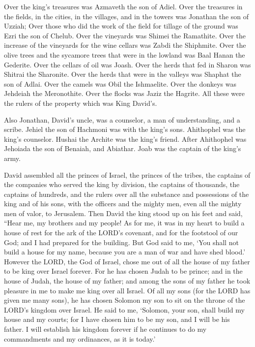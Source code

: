 \myverse{}Over the king’s treasures was Azmaveth the son of Adiel. Over
the treasures in the fields, in the cities, in the villages, and in the towers was Jonathan the son of
Uzziah;
\myverse{}Over those who did the work of the field for tillage of the ground was Ezri
the son of Chelub.
\myverse{}Over the vineyards was Shimei the Ramathite. Over the increase of the vineyards
for the wine cellars was Zabdi the Shiphmite.
\myverse{}Over the olive trees and the sycamore trees that were in the lowland was
Baal Hanan the Gederite. Over the cellars of oil was Joash.
\myverse{}Over the herds that fed in Sharon was Shitrai the Sharonite. Over the herds
that were in the valleys was Shaphat the son of Adlai.
\myverse{}Over the camels was Obil the Ishmaelite. Over the donkeys was Jehdeiah the
Meronothite. Over the flocks was Jaziz the Hagrite.
\myverse{}All these were the rulers of the property which was King David’s.

\myverse{}Also Jonathan, David’s uncle, was a counselor, a man of understanding,
and a scribe. Jehiel the son of Hachmoni was with the king’s sons.
\myverse{}Ahithophel was the king’s counselor. Hushai the Archite was the king’s friend.
\myverse{}After Ahithophel was Jehoiada the son of Benaiah, and Abiathar. Joab was
the captain of the king’s army.


\mychapter{} \myverse*{}David assembled all the princes of Israel, the princes of the
tribes, the captains of the companies who served the king by division, the captains of thousands, the
captains of hundreds, and the rulers over all the substance and possessions of the king and of his sons,
with the officers and the mighty men, even all the mighty men of valor, to Jerusalem.
\myverse{}Then David the king stood up on his feet and said, “Hear me, my brothers and
my people! As for me, it was in my heart to build a house of rest for the ark of the LORD’s covenant,
and for the footstool of our God; and I had prepared for the building.
\myverse{}But God said to me, ‘You shall not build a house for my name, because you are
a man of war and have shed blood.’
\myverse{}However the LORD, the God of Israel, chose me out of all the house of my father
to be king over Israel forever. For he has chosen Judah to be prince; and in the house of Judah, the house
of my father; and among the sons of my father he took pleasure in me to make me king over all Israel.
\myverse{}Of all my sons (for the LORD has given me many sons), he has chosen Solomon
my son to sit on the throne of the LORD’s kingdom over Israel.
\myverse{}He said to me, ‘Solomon, your son, shall build my house and my courts; for
I have chosen him to be my son, and I will be his father.
\myverse{}I will establish his kingdom forever if he continues to do my commandments
and my ordinances, as it is today.’

